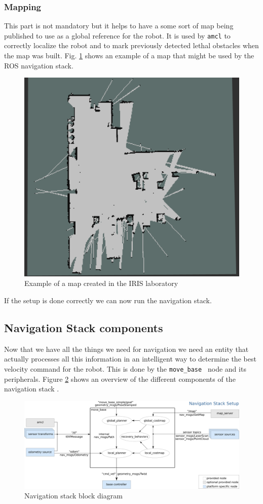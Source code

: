 \subsubsection{Mapping}
This part is not mandatory but it helps to have a some sort of map being published to use as a global reference for the robot. It is used by \texttt{amcl} to correctly localize the robot and to mark previously detected lethal obstacles when the map was built. Fig. \ref{fig:map} shows an example of a map that might be used by the ROS navigation stack.
\begin{figure}[!htb]
    \centering
    \includegraphics[scale=0.4]{imgs/chapter3/map2.png}
    \caption{Example of a map created in the IRIS laboratory}
    \label{fig:map}
\end{figure}
If the setup is done correctly we can now run the navigation stack.
\subsection{Navigation Stack components}
Now that we have all the things we need for navigation we need an entity that actually processes all this information in an intelligent way to determine the best velocity command for the robot. This is done by the \texttt{move\_base } node and its peripherals.
Figure \ref{fig:navstack} shows an overview of the different components of the navigation stack \cite{movebase}.
\begin{figure}[!htb]
    \centering
    \includegraphics[width=\linewidth]{imgs/chapter3/navstack.png}
    \caption{Navigation stack block diagram}
    \label{fig:navstack}
\end{figure}
